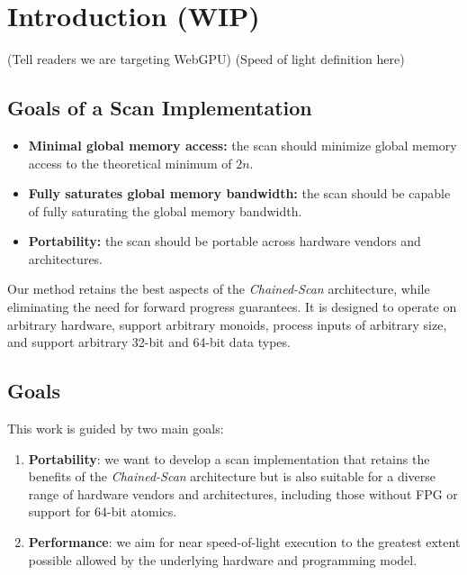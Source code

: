 \documentclass[sigconf]{acmart}
\begin{document}



\maketitle

\section{Introduction (WIP)}
 (Tell readers we are targeting WebGPU)
 (Speed of light definition here)
\subsection{Goals of a Scan Implementation}
\begin{itemize}
  \item \textbf{Minimal global memory access:} the scan should minimize global memory access to the theoretical minimum of $2n$.
  \item \textbf{Fully saturates global memory bandwidth:} the scan should be capable of fully saturating the global memory bandwidth.
  \item \textbf{Portability:} the scan should be portable across hardware vendors and architectures.
\end{itemize}
Our method retains the best aspects of the \emph{Chained-Scan} architecture, while eliminating the need for forward progress guarantees. It is designed to operate on arbitrary hardware, support arbitrary monoids, process inputs of arbitrary size, and support arbitrary 32-bit and 64-bit data types.
\subsection{Goals}
This work is guided by two main goals:
\begin{enumerate}
  \item \textbf{Portability}: we want to develop a scan implementation that retains the benefits of the \emph{Chained-Scan} architecture but is also suitable for a diverse range of hardware vendors and architectures, including those without FPG or support for 64-bit atomics.
  \item \textbf{Performance}: we aim for near speed-of-light execution to the greatest extent possible allowed by the underlying hardware and programming model.
\end{enumerate}
\end{document}

